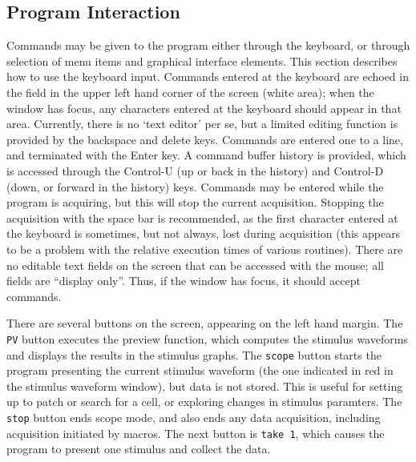 \documentclass[11pt, letterpaper, titlepage]{paper}
\begin{document}
\subsection{Program Interaction}
Commands may be given to the program either through the keyboard, 
or through selection of menu items and graphical interface 
elements. This section describes how to use the keyboard input. 
Commands entered at the keyboard are echoed in the field in the 
upper left hand corner of the screen (white area); when the window 
has focus, any characters entered at the keyboard should appear in 
that area. Currently, there is no `text editor' per se, but a 
limited editing function is provided by the backspace and delete 
keys. Commands are entered one to a line, and terminated with the 
Enter key. A command buffer history is provided, which is accessed 
through the Control-U (up or back in the history) and Control-D 
(down, or forward in the history) keys. Commands may be entered 
while the program is acquiring, but this will stop the current 
acquisition. Stopping the acquisition with the space bar is 
recommended, as the first character entered at the keyboard is 
sometimes, but not always, lost during acquisition (this appears 
to be a problem with the relative execution times of various 
routines). There are no editable text fields on the screen that 
can be accessed with the mouse; all fields are ``display only''. 
Thus, if the window has focus, it should accept commands.

There are several buttons on the screen, appearing on the left hand 
margin. The \texttt{PV} button executes the preview function, 
which computes the stimulus waveforms and displays the results in 
the stimulus graphs. The \texttt{scope} button starts the program 
presenting the current stimulus waveform (the one indicated in red 
in the stimulus waveform window), but data is not stored. This is 
useful for setting up to patch or search for a cell, or exploring 
changes in stimulus paramters. The \texttt{stop} button ends scope 
mode, and also ends any data acquisition, including acquisition 
initiated by macros. The next button is \texttt{take 1}, which 
causes the program to present one stimulus and collect the data. 
\end{document}
